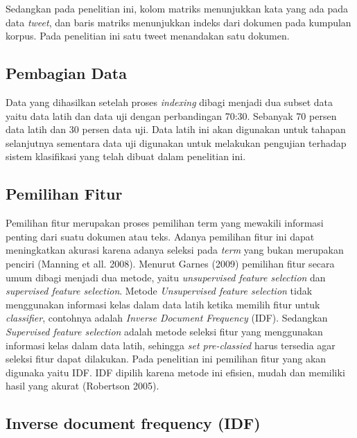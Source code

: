 Sedangkan pada penelitian ini, kolom matriks menunjukkan kata yang ada pada data \textit{tweet}, dan baris matriks menunjukkan indeks dari dokumen pada kumpulan korpus. Pada penelitian ini satu tweet menandakan satu dokumen.

\subsection*{Pembagian Data}

Data yang dihasilkan setelah proses \textit{indexing} dibagi  menjadi  dua subset data yaitu data latih dan data uji dengan perbandingan 70:30. Sebanyak 70 persen data latih dan 30 persen data uji. Data latih ini akan digunakan untuk tahapan selanjutnya sementara data uji digunakan untuk melakukan pengujian terhadap sistem klasifikasi yang telah dibuat dalam penelitian ini.

\subsection*{Pemilihan Fitur}

Pemilihan fitur merupakan proses pemilihan term yang mewakili informasi penting dari suatu dokumen atau teks. Adanya pemilihan fitur ini dapat meningkatkan akurasi karena adanya seleksi pada \textit{term} yang bukan merupakan penciri (Manning et all. 2008). Menurut Garnes (2009) pemilihan fitur secara umum dibagi menjadi dua metode, yaitu \textit{unsupervised feature selection} dan \textit{supervised feature selection}. Metode \textit{Unsupervised feature selection} tidak menggunakan informasi kelas dalam data latih ketika memilih fitur untuk \textit{classifier}, contohnya adalah \textit{Inverse Document Frequency} (IDF). Sedangkan \textit{Supervised feature selection}  adalah metode seleksi fitur yang menggunakan informasi kelas dalam data latih, sehingga \textit{set pre-classied} harus tersedia agar seleksi fitur dapat dilakukan. Pada penelitian ini pemilihan fitur yang akan digunaka yaitu IDF. IDF dipilih karena metode ini efisien, mudah dan memiliki hasil yang akurat (Robertson 2005).


\subsection*{Inverse document frequency (IDF)}

